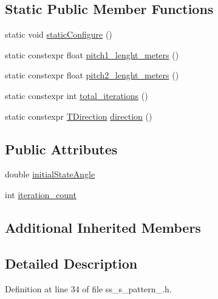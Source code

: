 \subsection*{Static Public Member Functions}
\begin{DoxyCompactItemize}
\item 
static void \hyperlink{structsm__dance__bot__strikes__back_1_1SS5_1_1SsSPattern1_a789bb34f94d642e64ab29f5fb7898627}{static\+Configure} ()
\item 
static constexpr float \hyperlink{structsm__dance__bot__strikes__back_1_1SS5_1_1SsSPattern1_a5c55bbb1763df9f69e935208f9a56fba}{pitch1\+\_\+lenght\+\_\+meters} ()
\item 
static constexpr float \hyperlink{structsm__dance__bot__strikes__back_1_1SS5_1_1SsSPattern1_a535f972688267ab3821efe9a14c968fd}{pitch2\+\_\+lenght\+\_\+meters} ()
\item 
static constexpr int \hyperlink{structsm__dance__bot__strikes__back_1_1SS5_1_1SsSPattern1_ac727a29abc528788363f77ed237ac29f}{total\+\_\+iterations} ()
\item 
static constexpr \hyperlink{namespacesm__dance__bot__strikes__back_1_1SS5_a9bfe9437a81f94ff39bae6daa0cec2e6}{T\+Direction} \hyperlink{structsm__dance__bot__strikes__back_1_1SS5_1_1SsSPattern1_ab6ad418e38e92a3f8595f266fdb0e621}{direction} ()
\end{DoxyCompactItemize}
\subsection*{Public Attributes}
\begin{DoxyCompactItemize}
\item 
double \hyperlink{structsm__dance__bot__strikes__back_1_1SS5_1_1SsSPattern1_a22982e440bf9ff5e8d2893ab30b645b3}{initial\+State\+Angle}
\item 
int \hyperlink{structsm__dance__bot__strikes__back_1_1SS5_1_1SsSPattern1_a44964676a99cb2e4db36327c924a5a7d}{iteration\+\_\+count}
\end{DoxyCompactItemize}
\subsection*{Additional Inherited Members}


\subsection{Detailed Description}


Definition at line 34 of file ss\+\_\+s\+\_\+pattern\+\_.\+h.




